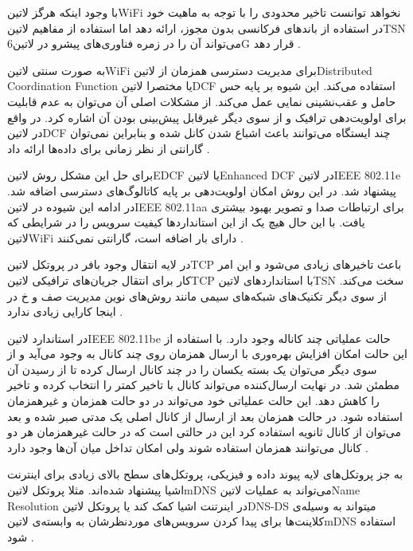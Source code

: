 با وجود اینکه هرگز ‌لاتین{WiFi} نخواهد توانست تاخیر محدودی را با توجه به ماهیت خود در استفاده از باندهای فرکانسی بدون مجوز، ارائه دهد اما استفاده از مفاهیم ‌لاتین{TSN}
می‌تواند آن را در زمره فناوری‌های پیشرو در ‌لاتین{6G} قرار دهد
.

به صورت سنتی ‌لاتین{WiFi} برای مدیریت دسترسی همزمان از ‌لاتین{Distributed Coordination Function} یا مختصرا ‌لاتین{DCF} استفاده می‌کند.
این شیوه بر پایه حس حامل و عقب‌نشینی نمایی عمل می‌کند. از مشکلات اصلی آن می‌توان به عدم قابلیت برای اولویت‌دهی ترافیک و از سوی دیگر غیرقابل پیش‌بینی بودن
آن اشاره کرد. در واقع در ‌لاتین{DCF} چند ایستگاه می‌توانند باعث اشباع شدن کانل شده و بنابراین نمی‌توان گارانتی از نظر زمانی برای داده‌ها ارائه داد
.

برای حل این مشکل روش ‌لاتین{EDCF} یا ‌لاتین{Enhanced DCF} در ‌لاتین{IEEE 802.11e} پیشنهاد شد. در این روش امکان اولویت‌دهی بر پایه
کاتالوگ‌های دسترسی اضافه شد. در ادامه این شیوده در ‌لاتین{IEEE 802.11aa} برای ارتباطات صدا و تصویر بهبود بیشتری یافت.
با این حال هیچ یک از این استانداردها کیفیت سرویس را در شرایطی که ‌لاتین{WiFi} دارای بار اضافه است، گارانتی نمی‌کنند
.

در لایه انتقال وجود بافر در پروتکل ‌لاتین{TCP} باعث تاخیرهای زیادی می‌شود و این امر کار برای انتقال جریان‌های ترافیکی ‌لاتین{TCP}
با استانداردهای ‌لاتین{TSN} سخت می‌کند. از سوی دیگر تکنیک‌های شبکه‌های سیمی مانند روش‌های نوین مدیریت صف و ‌خ در اینجا
کارایی زیادی ندارد
.

در استاندارد ‌لاتین{IEEE 802.11be} حالت عملیاتی چند کاناله وجود دارد. با استفاده از این حالت امکان افزایش بهره‌وری با ارسال همزمان
روی چند کانال به وجود می‌آید و از سوی دیگر می‌توان یک بسته یکسان را در چند کانال ارسال کرده تا از رسیدن آن مطمئن شد. در نهایت ارسال‌کننده
می‌تواند کانال با تاخیر کمتر را انتخاب کرده و تاخیر را کاهش دهد. این حالت عملیاتی خود می‌تواند در دو حالت همزمان و غیرهمزمان استفاده شود.
در حالت همزمان بعد از ارسال از کانال اصلی یک مدتی صبر شده و بعد می‌توان از کانال ثانویه استفاده کرد این در حالتی است که در حالت غیرهمزمان
هر دو کانال می‌توانند همزمان استفاده شوند ولی امکان تداخل میان آن‌ها وجود دارد
.



به جز پروتکل‌های لایه پیوند داده و فیزیکی، پروتکل‌های سطح بالای زیادی برای اینترنت اشیا پیشنهاد شده‌اند.
مثلا پروتکل ‌لاتین{mDNS} می‌تواند به عملیات ‌لاتین{Name Resolution} در اینرتنت اشیا کمک کند یا پروتکل
‌لاتین{DNS-DS} میتواند به وسیله‌ی کلاینت‌ها برای پیدا کردن سرویس‌های موردنظرشان به وابسته‌ی ‌لاتین{mDNS} استفاده شود
.


